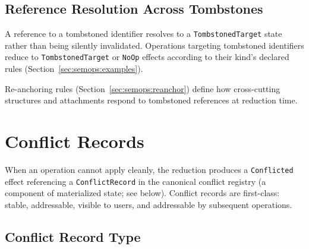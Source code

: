 \documentclass[11pt,letterpaper]{report}
\newcounter{requirement}[chapter]
\begin{document}
\subsection{Reference Resolution Across Tombstones}

\begin{requirement}
  \label{req:semops:tombstoned-reference-resolution}
  A reference to a tombstoned identifier resolves to a
  \texttt{TombstonedTarget} state rather than being silently
  invalidated. Operations targeting tombstoned identifiers reduce to
  \texttt{TombstonedTarget} or \texttt{NoOp} effects according to
  their kind's declared rules (Section~\ref{sec:semops:examples}).

  Re-anchoring rules (Section~\ref{sec:semops:reanchor}) define how
  cross-cutting structures and attachments respond to tombstoned
  references at reduction time.
\end{requirement}

\section{Conflict Records}
\label{sec:semops:conflicts}

When an operation cannot apply cleanly, the reduction produces a
\texttt{Conflicted} effect referencing a \texttt{ConflictRecord} in
the canonical conflict registry (a component of materialized state;
see below). Conflict records are first-class: stable, addressable,
visible to users, and addressable by subsequent operations.

\subsection{Conflict Record Type}
\end{document}
